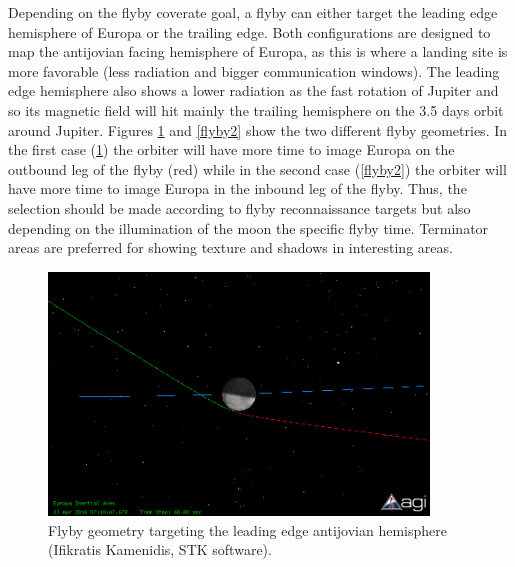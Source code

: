 Depending on the flyby coverate goal, a flyby can either target the leading edge hemisphere of Europa or the trailing edge. Both configurations are designed to map the antijovian facing hemisphere of Europa, as this is where a landing site is more favorable (less radiation and bigger communication windows). The leading edge hemisphere also shows a lower radiation as the fast rotation of Jupiter and so its magnetic field will hit mainly the trailing hemisphere on the 3.5 days orbit around Jupiter. Figures \ref{flyby1} and \ref{flyby2} show the two different flyby geometries. In the first case (\ref{flyby1}) the orbiter will have more time to image Europa on the outbound leg of the flyby (red) while in the second case (\ref{flyby2}) the orbiter will have more time to image Europa in the inbound leg of the flyby. Thus, the selection should be made according to flyby reconnaissance targets but also depending on the illumination of the moon the specific flyby time. Terminator areas are preferred for showing texture and shadows in interesting areas.
\begin{figure}[htb!]
\centering
\includegraphics[width=0.9\textwidth]{figures/Orbiter/flyby1.png}
\caption{Flyby geometry targeting the leading edge antijovian hemisphere (Ifikratis Kamenidis, STK software).}
\label{flyby1}
\end{figure}

